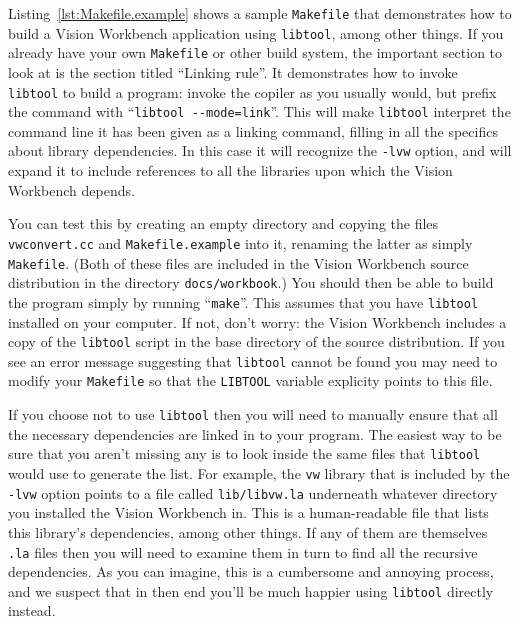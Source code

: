 
Listing~\ref{lst:Makefile.example} shows a sample \verb#Makefile# 
that demonstrates how to build a Vision Workbench application using 
\verb#libtool#, among other things.  If you already have your own 
\verb#Makefile# or other build system, the important section to 
look at is the section titled ``Linking rule''.  It demonstrates 
how to invoke \verb#libtool# to build a program: invoke the copiler 
as you usually would, but prefix the command with 
``\verb#libtool --mode=link#''.  This will make \verb#libtool# 
interpret the command line it has been given as a linking command, 
filling in all the specifics about library dependencies.  In this 
case it will recognize the \verb#-lvw# option, and will expand it 
to include references to all the libraries upon which the Vision 
Workbench depends.

You can test this by creating an empty directory and copying the 
files \verb#vwconvert.cc# and \verb#Makefile.example# into it, 
renaming the latter as simply \verb#Makefile#.  (Both of these 
files are included in the Vision Workbench source distribution 
in the directory \verb#docs/workbook#.)  You should then 
be able to build the program simply by running ``\verb#make#''. 
This assumes that you have \verb#libtool# installed on your 
computer.  If not, don't worry: the Vision Workbench includes a 
copy of the \verb#libtool# script in the base directory of the 
source distribution.  If you see an error message suggesting that 
\verb#libtool# cannot be found you may need to modify your 
\verb#Makefile# so that the \verb#LIBTOOL# variable explicity 
points to this file.

If you choose not to use \verb#libtool# then you will need to 
manually ensure that all the necessary dependencies are linked 
in to your program.  The easiest way to be sure that you aren't 
missing any is to look inside the same files that \verb#libtool# 
would use to generate the list.  For example, the \verb#vw# 
library that is included by the \verb#-lvw# option points to a 
file called \verb#lib/libvw.la# underneath whatever directory you 
installed the Vision Workbench in.  This is a human-readable file 
that lists this library's dependencies, among other things.  If 
any of them are themselves \verb#.la# files then you will need 
to examine them in turn to find all the recursive dependencies.
As you can imagine, this is a cumbersome and annoying process, 
and we suspect that in then end you'll be much happier using 
\verb#libtool# directly instead.

